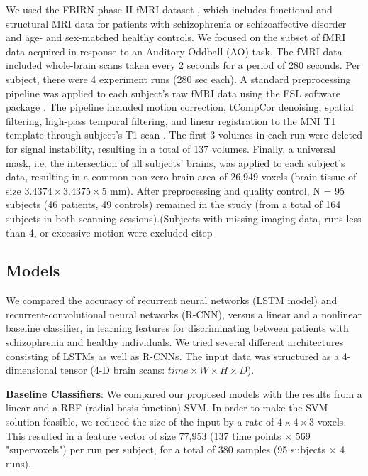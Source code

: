 \documentclass{article}
\begin{document}
We used the FBIRN phase-II fMRI dataset \citep{Keator2016}
, which includes functional and structural MRI data for patients with schizophrenia or schizoaffective disorder and age- and sex-matched healthy controls. We focused on the subset of fMRI data acquired in response to an Auditory Oddball (AO) task.
The fMRI data included whole-brain scans taken every 2 seconds for a period of 280 seconds. Per subject, there were 4 experiment runs (280 sec each).
A standard preprocessing pipeline was applied to each subject's raw fMRI data using the FSL software package \citep{Jenkinson2012}. The pipeline included motion correction, tCompCor denoising, spatial filtering, high-pass temporal filtering, and linear registration to the MNI T1 template through subject's T1 scan \citep[see][for a more detailed description of the preprocessing stages]{Gheiratmand2017}. The first 3 volumes in each run were deleted for signal instability, resulting in a total of 137 volumes. Finally, a universal mask, i.e. the intersection of all subjects' brains, was applied to each subject's data, resulting in a common non-zero brain area of 26,949 voxels (brain tissue of size $3.4374\times3.4375\times5$ mm).
After preprocessing and quality control, N = 95 subjects (46 patients, 49 controls) remained in the study (from a total of 164 subjects in both scanning sessions).(Subjects with missing imaging data, runs less than 4, or excessive motion were excluded citep


\subsection{Models}

We compared the accuracy of recurrent neural networks (LSTM model) and recurrent-convolutional neural networks (R-CNN), versus a linear and a nonlinear baseline classifier, in learning features for discriminating between patients with schizophrenia and healthy individuals. We tried several different architectures consisting of LSTMs as well as R-CNNs. The input data was structured as a 4-dimensional tensor (4-D brain scans: $time\times W\times H\times D$).

\textbf{Baseline Classifiers}: We compared our proposed models with the results from a linear and a RBF (radial basis function) SVM. In order to make the SVM solution feasible, we reduced the size of the input by a rate of $4\times4\times3$ voxels. This resulted in a feature vector of size 77,953 (137 time points $\times$ 569 "supervoxels") per run per subject, for a total of 380 samples (95 subjects $\times$ 4 runs).
\end{document}
